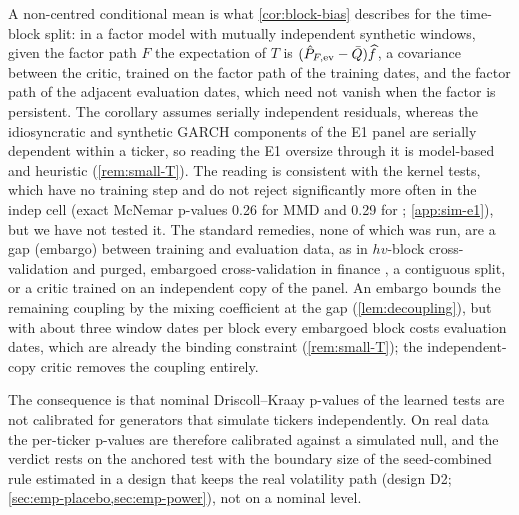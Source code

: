 A non-centred conditional mean is what \cref{cor:block-bias} describes for the time-block split:
in a factor model with mutually independent synthetic windows, given the factor path $F$ the
expectation of $T$ is $(\hat P_{F,\mathrm{ev}}-\bar Q)\widehat{f}$, a covariance between the critic, trained on
the factor path of the training dates, and the factor path of the adjacent evaluation dates, which
need not vanish when the factor is persistent. The corollary assumes serially independent
residuals, whereas the idiosyncratic and synthetic GARCH components of the E1 panel are serially
dependent within a ticker, so reading the E1 oversize through it is model-based and heuristic
(\cref{rem:small-T}). The reading is consistent with the kernel tests, which have no training step and do not reject significantly more often in the indep cell (exact
McNemar p-values 0.26 for MMD and 0.29 for \SigMMD{}; \cref{app:sim-e1}), but we have not tested
it. The standard remedies, none of which was run, are a gap (embargo) between training and
evaluation data, as in $hv$-block cross-validation \citep{racine_2000_consistent} and purged,
embargoed cross-validation in finance \citep{lopezdeprado_2018_advances}, a contiguous split, or
a critic trained on an independent copy of the panel. An embargo bounds the remaining coupling by
the mixing coefficient at the gap (\cref{lem:decoupling}), but with about three window dates per
block every embargoed block costs evaluation dates, which are already the binding constraint
(\cref{rem:small-T}); the independent-copy critic removes the coupling entirely.

The consequence is that nominal Driscoll--Kraay p-values of the learned tests are not calibrated
for generators that simulate tickers independently. On real data the per-ticker p-values are
therefore calibrated against a simulated null, and the verdict rests on the anchored test with
the boundary size of the seed-combined rule estimated in a design that keeps the real volatility
path (design D2; \cref{sec:emp-placebo,sec:emp-power}), not on a nominal level.
